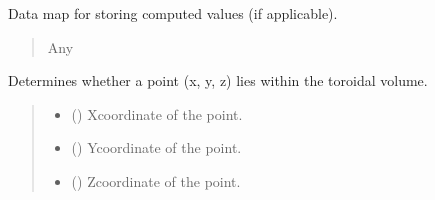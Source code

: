 \documentclass[letterpaper,10pt,english]{sphinxmanual}
\begin{document}
\begin{fulllineitems}

\begin{fulllineitems}
\label{\detokenize{src:src.Torus.Torus.dmap}}
\pysigstartsignatures
{}
\pysigstopsignatures
\sphinxAtStartPar
Data map for storing computed values (if applicable).
\begin{quote}\begin{description}
\sphinxAtStartPar
Any

\end{description}\end{quote}

\end{fulllineitems}


\begin{fulllineitems}
\label{\detokenize{src:src.Torus.Torus.contains_point}}
\pysigstartsignatures
{}
\pysigstopsignatures
\sphinxAtStartPar
Determines whether a point (x, y, z) lies within the toroidal volume.
\begin{quote}\begin{description}
\begin{itemize}
\item {} 
\sphinxAtStartPar
{} () \textendash{} X\sphinxhyphen{}coordinate of the point.

\item {} 
\sphinxAtStartPar
{} () \textendash{} Y\sphinxhyphen{}coordinate of the point.

\item {} 
\sphinxAtStartPar
{} () \textendash{} Z\sphinxhyphen{}coordinate of the point.


\end{itemize}
\end{description}
\end{quote}
\end{fulllineitems}
\end{fulllineitems}
\end{document}
